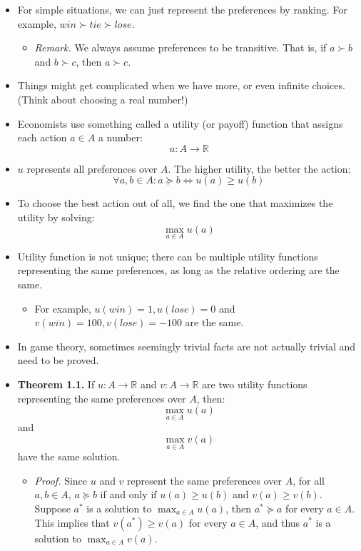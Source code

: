 \documentclass[notitlepage]{article}
\begin{document}
\begin{itemize}
\begin{itemize}
        \item Because an action must leads to an outcome, to simplify our mathematical derivation, we simply talk about preferences over the actions \(A\) most of the time. 
    \end{itemize}
    \item For simple situations, we can just represent the preferences by ranking. For example, \(win \succ tie \succ lose\).
    \begin{itemize}
        \item \textit{Remark.} We always assume preferences to be transitive. That is, if \(a \succ b\) and \(b \succ c\), then \(a \succ c\).
    \end{itemize}
    \item Things might get complicated when we have more, or even infinite choices. (Think about choosing a real number!)
    \item Economists use something called a utility (or payoff) function that assigns each action \(a \in A\) a number: \[u: A \to \mathbb{R}\]
    \item \(u\) represents all preferences over \(A\). The higher utility, the better the action: \[\forall a, b \in A: a \succeq b \iff u(a) \ge u(b)\]
    \item To choose the best action out of all, we find the one that maximizes the utility by solving: \[\max_{a\in A}u(a)\]
    \item Utility function is not unique; there can be multiple utility functions representing the same preferences, as long as the relative ordering are the same.
    \begin{itemize}
        \item For example, $u(win) = 1, u(lose) = 0$ and $v(win) = 100, v(lose) = -100$ are the same.
    \end{itemize}
    \item In game theory, sometimes seemingly trivial facts are not actually trivial and need to be proved.
    \item \textbf{Theorem 1.1.} If \(u: A \to \mathbb{R}\) and \(v: A \to \mathbb{R}\) are two utility functions representing the same preferences over \(A\), then:
    \[
    \max_{a\in A}u(a)
    \]
    and
    \[
    \max_{a\in A}v(a)
    \]
    have the same solution.
    \begin{itemize}
        \item \textit{Proof.} Since \(u\) and \(v\) represent the same preferences over \(A\), for all \(a, b \in A\), \(a \succeq b\) if and only if \(u(a) \ge u(b)\) and \(v(a) \ge v(b)\). Suppose \(a^*\) is a solution to \(\max_{a\in A}u(a)\), then \(a^* \succeq a\) for every \(a \in A\). This implies that \(v(a^*) \ge v(a)\) for every \(a \in A\), and thus \(a^*\) is a solution to \(\max_{a\in A}v(a)\).
    \end{itemize}
\end{itemize}
\end{document}
